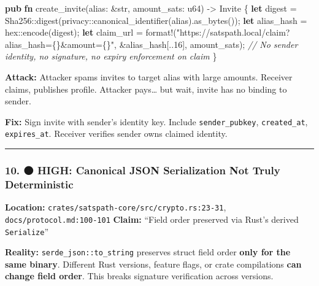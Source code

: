 \documentclass[
]{article}
\newenvironment{Shaded}{}{}
\newcommand{\CommentTok}[1]{\textcolor[rgb]{0.38,0.63,0.69}{\textit{#1}}}
\newcommand{\DataTypeTok}[1]{\textcolor[rgb]{0.56,0.13,0.00}{#1}}
\newcommand{\DecValTok}[1]{\textcolor[rgb]{0.25,0.63,0.44}{#1}}
\newcommand{\KeywordTok}[1]{\textcolor[rgb]{0.00,0.44,0.13}{\textbf{#1}}}
\newcommand{\NormalTok}[1]{#1}
\newcommand{\OperatorTok}[1]{\textcolor[rgb]{0.40,0.40,0.40}{#1}}
\newcommand{\PreprocessorTok}[1]{\textcolor[rgb]{0.74,0.48,0.00}{#1}}
\newcommand{\StringTok}[1]{\textcolor[rgb]{0.25,0.44,0.63}{#1}}
\begin{document}
\begin{Shaded}
\begin{Highlighting}[]
\KeywordTok{pub} \KeywordTok{fn}\NormalTok{ create\_invite(alias}\OperatorTok{:} \OperatorTok{\&}\DataTypeTok{str}\OperatorTok{,}\NormalTok{ amount\_sats}\OperatorTok{:} \DataTypeTok{u64}\NormalTok{) }\OperatorTok{{-}\textgreater{}}\NormalTok{ Invite }\OperatorTok{\{}
    \KeywordTok{let}\NormalTok{ digest }\OperatorTok{=} \PreprocessorTok{Sha256::}\NormalTok{digest(}\PreprocessorTok{privacy::}\NormalTok{canonical\_identifier(alias)}\OperatorTok{.}\NormalTok{as\_bytes())}\OperatorTok{;}
    \KeywordTok{let}\NormalTok{ alias\_hash }\OperatorTok{=} \PreprocessorTok{hex::}\NormalTok{encode(digest)}\OperatorTok{;}
    \KeywordTok{let}\NormalTok{ claim\_url }\OperatorTok{=} \PreprocessorTok{format!}\NormalTok{(}\StringTok{"https://satspath.local/claim?alias\_hash=\{\}\&amount=\{\}"}\OperatorTok{,} \OperatorTok{\&}\NormalTok{alias\_hash[}\OperatorTok{..}\DecValTok{16}\NormalTok{]}\OperatorTok{,}\NormalTok{ amount\_sats)}\OperatorTok{;}
    \CommentTok{// No sender identity, no signature, no expiry enforcement on claim}
\OperatorTok{\}}
\end{Highlighting}
\end{Shaded}

\textbf{Attack:} Attacker spams invites to target alias with large
amounts. Receiver claims, publishes profile. Attacker pays\ldots{} but
wait, invite has no binding to sender.

\textbf{Fix:} Sign invite with sender's identity key. Include
\texttt{sender\_pubkey}, \texttt{created\_at}, \texttt{expires\_at}.
Receiver verifies sender owns claimed identity.

\begin{center}\rule{0.5\linewidth}{0.5pt}\end{center}

\hypertarget{high-canonical-json-serialization-not-truly-deterministic}{%
\subsubsection{10. 🟠 HIGH: Canonical JSON Serialization Not Truly
Deterministic}\label{high-canonical-json-serialization-not-truly-deterministic}}

\textbf{Location:} \texttt{crates/satspath-core/src/crypto.rs:23-31},
\texttt{docs/protocol.md:100-101} \textbf{Claim:} ``Field order
preserved via Rust's derived \texttt{Serialize}''

\textbf{Reality:} \texttt{serde\_json::to\_string} preserves struct
field order \textbf{only for the same binary}. Different Rust versions,
feature flags, or crate compilations \textbf{can change field order}.
This breaks signature verification across versions.
\end{document}
